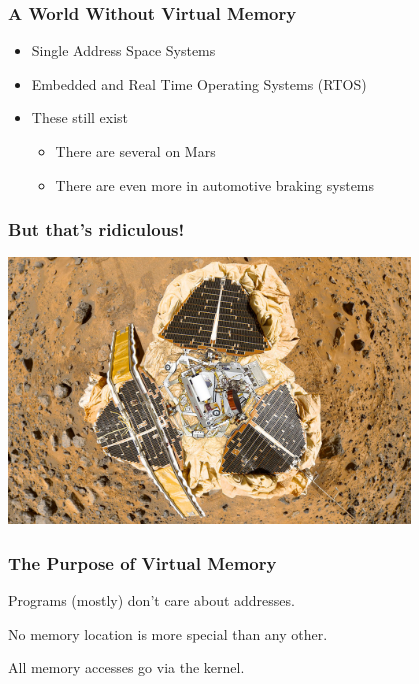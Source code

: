 \documentclass[pdftex]{beamer} %
\begin{document}
\begin{frame}
  \frametitle{A World Without Virtual Memory}
  \begin{itemize}
  \item Single Address Space Systems
  \item Embedded and Real Time Operating Systems (RTOS)
  \item These still exist
    \pause
    \begin{itemize}
    \item There are several on Mars
      \pause
    \item There are even more in automotive braking systems
    \end{itemize}
  \end{itemize}
\end{frame}

\begin{frame}
  \frametitle{But that's ridiculous!}
    \begin{center}
    \includegraphics[width=0.8\textwidth]{../../figures/pathfinder.jpg}
  \end{center}

\end{frame}

\begin{frame}
  \frametitle{The Purpose of Virtual Memory}
  \begin{description}[labelwidth=\widthof{Simplification}]
  \item [Simplification] Programs (mostly) don't care about addresses.
  \item [Portability] No memory location is more special than any other.
  \item [Protection] All memory accesses go via the kernel.
  \end{description}
\end{frame}
\end{document}
